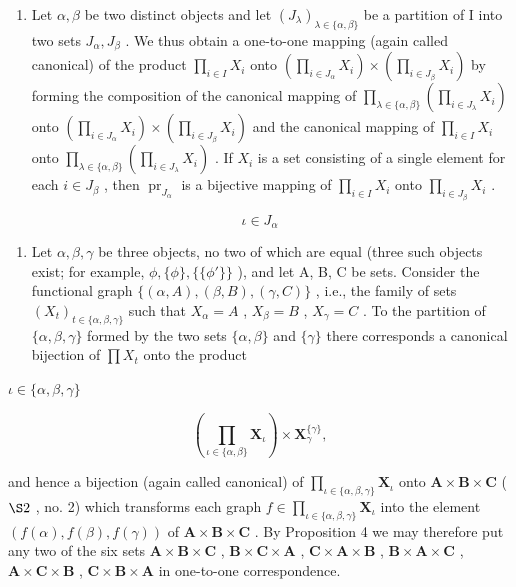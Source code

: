 \begin{enumerate}
\def\labelenumi{(\arabic{enumi})}
\tightlist
\item
  Let \(\alpha, \beta\) be two distinct objects and let \((J_{\lambda})_{\lambda \in \{\alpha, \beta\}}\) be a partition of I into two sets \(J_{\alpha}, J_{\beta}\) . We thus obtain a one-to-one mapping (again called canonical) of the product \(\prod_{i \in I} X_i\) onto \(\left(\prod_{i \in J_{\alpha}} X_i\right) \times \left(\prod_{i \in J_{\beta}} X_i\right)\) by forming the composition of the canonical mapping of \(\prod_{\lambda \in \{\alpha, \beta\}} \left(\prod_{i \in J_{\lambda}} X_i\right)\) onto \(\left(\prod_{i \in J_{\alpha}} X_i\right) \times \left(\prod_{i \in J_{\beta}} X_i\right)\) and the canonical mapping of \(\prod_{i \in I} X_i\) onto \(\prod_{\lambda \in \{\alpha, \beta\}} \left(\prod_{i \in J_{\lambda}} X_i\right)\) . If \(X_i\) is a set consisting of a single element for each \(i \in J_{\beta}\) , then \(\operatorname{pr}_{J_{\alpha}}\) is a bijective mapping of \(\prod_{i \in I} X_i\) onto \(\prod_{i \in J_{\beta}} X_i\) .
\end{enumerate}

\[
\iota \in J _ {\alpha}
\]

\begin{enumerate}
\def\labelenumi{(\arabic{enumi})}
\setcounter{enumi}{1}
\tightlist
\item
  Let \(\alpha, \beta, \gamma\) be three objects, no two of which are equal (three such objects exist; for example, \(\phi, \{\phi\}, \{\{\phi'\}\}\) ), and let A, B, C be sets. Consider the functional graph \(\{(\alpha, A), (\beta, B), (\gamma, C)\}\) , i.e., the family of sets \((X_{t})_{t \in \{\alpha, \beta, \gamma\}}\) such that \(X_{\alpha} = A\) , \(X_{\beta} = B\) , \(X_{\gamma} = C\) . To the partition of \(\{\alpha, \beta, \gamma\}\) formed by the two sets \(\{\alpha, \beta\}\) and \(\{\gamma\}\) there corresponds a canonical bijection of \(\prod X_{t}\) onto the product
\end{enumerate}

\(\iota \in \{\alpha, \beta, \gamma\}\)

\[
\left(\prod_ {\iota \in \{\alpha , \beta \}} \mathbf {X} _ {\iota}\right) \times \mathbf {X} _ {\gamma} ^ {\{\gamma \}},
\]

and hence a bijection (again called canonical) of \(\prod_{\iota \in \{\alpha, \beta, \gamma\}} \mathbf{X}_{\iota}\) onto \(\mathbf{A} \times \mathbf{B} \times \mathbf{C}\) ( \(\S 2\) , no. 2) which transforms each graph \(f \in \prod_{\iota \in \{\alpha, \beta, \gamma\}} \mathbf{X}_{\iota}\) into the element \((f(\alpha), f(\beta), f(\gamma))\) of \(\mathbf{A} \times \mathbf{B} \times \mathbf{C}\) . By Proposition 4 we may therefore put any two of the six sets \(\mathbf{A} \times \mathbf{B} \times \mathbf{C}\) , \(\mathbf{B} \times \mathbf{C} \times \mathbf{A}\) , \(\mathbf{C} \times \mathbf{A} \times \mathbf{B}\) , \(\mathbf{B} \times \mathbf{A} \times \mathbf{C}\) , \(\mathbf{A} \times \mathbf{C} \times \mathbf{B}\) , \(\mathbf{C} \times \mathbf{B} \times \mathbf{A}\) in one-to-one correspondence.

